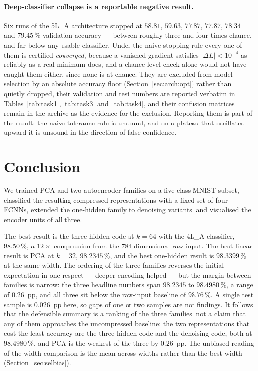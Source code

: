 \documentclass[11pt,a4paper]{article}
\begin{document}
\paragraph{Deep-classifier collapse is a reportable negative result.}\label{sec:obs:degenerate}
Six runs of the 5L\_A architecture stopped at $58.81$, $59.63$, $77.87$, $77.87$, $78.34$ and
$79.45\,\%$ validation accuracy --- between roughly three and four times chance, and far below any
usable classifier.  Under the naive stopping rule every one of them is certified
\emph{converged}, because a vanished gradient satisfies $|\Delta L|<10^{-4}$ as reliably as a real
minimum does, and a chance-level check alone would not have caught them either, since none is at
chance.  They are excluded from model selection by an absolute accuracy floor
(Section~\ref{sec:arch:opt}) rather than quietly dropped, their validation and test numbers are
reported verbatim in Tables~\ref{tab:task1}, \ref{tab:task3} and~\ref{tab:task4}, and their
confusion matrices remain in the archive as the evidence for the exclusion.  Reporting them is part
of the result: the naive tolerance rule is unsound, and on a plateau that oscillates upward it is
unsound in the direction of false confidence.

\section{Conclusion}\label{sec:conclusion}
We trained PCA and two autoencoder families on a five-class MNIST subset, classified the resulting
compressed representations with a fixed set of four FCNNs, extended the one-hidden family to
denoising variants, and visualised the encoder units of all three.

The best result is the three-hidden code at $k=64$ with the 4L\_A classifier, $98.50\,\%$, a
$12\times$ compression from the $784$-dimensional raw input.  The best linear result is PCA at
$k=32$, $98.2345\,\%$, and the best one-hidden result is $98.3399\,\%$ at the same width.  The
ordering of the three families reverses the initial expectation in one respect --- deeper encoding
helped --- but the margin between families is narrow: the three headline numbers span
$98.2345$ to $98.4980\,\%$, a range of $0.26$~pp, and all three sit below the raw-input baseline of $98.76\,\%$.  A single test sample is $0.026$~pp here, so gaps of one or two
samples are not findings.  It follows that the defensible summary is a ranking of the three
families, not a claim that any of them approaches the uncompressed baseline: the two
representations that cost the least accuracy are the three-hidden code and the denoising code,
both at $98.4980\,\%$, and PCA is the weakest of the three by $0.26$~pp.  The unbiased reading of
the width comparison is the mean across widths rather than the best width
(Section~\ref{sec:selbias}).
\end{document}
